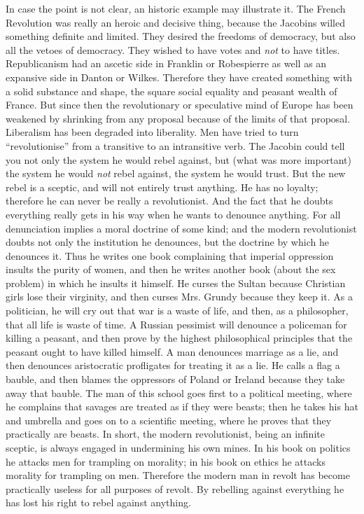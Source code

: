 \documentclass{book}
\begin{document}
In case the point is not clear, an historic example may illustrate it. The French Revolution was really an heroic and decisive thing, because the Jacobins willed something definite and limited. They desired the freedoms of democracy, but also all the vetoes of democracy. They wished to have votes and \emph{not} to have titles. Republicanism had an ascetic side in Franklin or Robespierre as well as an expansive side in Danton or Wilkes. Therefore they have created something with a solid substance and shape, the square social equality and peasant wealth of France. But since then the revolutionary or speculative mind of Europe has been weakened by shrinking from any proposal because of the limits of that proposal. Liberalism has been degraded into liberality. Men have tried to turn “revolutionise” from a transitive to an intransitive verb. The Jacobin could tell you not only the system he would rebel against, but (what was more important) the system he would \emph{not} rebel against, the system he would trust. But the new rebel is a sceptic, and will not entirely trust anything. He has no loyalty; therefore he can never be really a revolutionist. And the fact that he doubts everything really gets in his way when he wants to denounce anything. For all denunciation implies a moral doctrine of some kind; and the modern revolutionist doubts not only the institution he denounces, but the doctrine by which he denounces it. Thus he writes one book complaining that imperial oppression insults the purity of women, and then he writes another book (about the sex problem) in which he insults it himself. He curses the Sultan because Christian girls lose their virginity, and then curses Mrs. Grundy because they keep it. As a politician, he will cry out that war is a waste of life, and then, as a philosopher, that all life is waste of time. A Russian pessimist will denounce a policeman for killing a peasant, and then prove by the highest philosophical principles that the peasant ought to have killed himself. A man denounces marriage as a lie, and then denounces aristocratic profligates for treating it as a lie. He calls a flag a bauble, and then blames the oppressors of Poland or Ireland because they take away that bauble. The man of this school goes first to a political meeting, where he complains that savages are treated as if they were beasts; then he takes his hat and umbrella and goes on to a scientific meeting, where he proves that they practically are beasts. In short, the modern revolutionist, being an infinite sceptic, is always engaged in undermining his own mines. In his book on politics he attacks men for trampling on morality; in his book on ethics he attacks morality for trampling on men. Therefore the modern man in revolt has become practically useless for all purposes of revolt. By rebelling against everything he has lost his right to rebel against anything.
\end{document}
